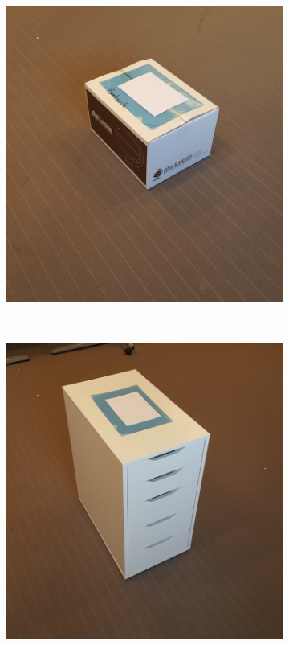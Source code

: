 \begin{figure}
\begin{subfigure}[b]{0.3\textwidth}
		\caption{}
		\label{fig:package_2}
	\end{subfigure}
	\vspace{3mm}\\
	\begin{subfigure}[b]{0.3\textwidth}
		\includegraphics[width=\textwidth]{figures/package_3.jpg}
		\caption{}
		\label{fig:package_3}
	\end{subfigure}
	~~~
	\begin{subfigure}[b]{0.3\textwidth}
		\includegraphics[width=\textwidth]{figures/package_4.jpg}

\end{subfigure}
\end{figure}
